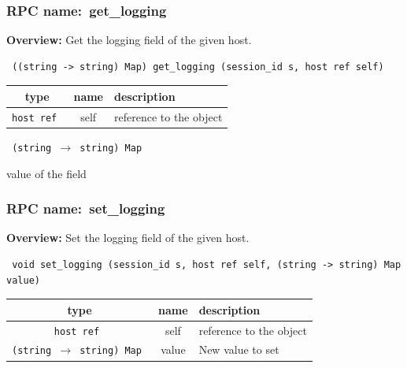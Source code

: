 \subsubsection{RPC name:~get\_logging}

{\bf Overview:} 
Get the logging field of the given host.

\begin{verbatim} ((string -> string) Map) get_logging (session_id s, host ref self)\end{verbatim}



 
\vspace{0.3cm}
\begin{tabular}{|c|c|p{7cm}|}
 \hline
{\bf type} & {\bf name} & {\bf description} \\ \hline
{\tt host ref } & self & reference to the object \\ \hline 

\end{tabular}

\vspace{0.3cm}

{\tt 
(string $\rightarrow$ string) Map
}


value of the field
\vspace{0.3cm}
\vspace{0.3cm}
\vspace{0.3cm}
\subsubsection{RPC name:~set\_logging}

{\bf Overview:} 
Set the logging field of the given host.

\begin{verbatim} void set_logging (session_id s, host ref self, (string -> string) Map value)\end{verbatim}



 
\vspace{0.3cm}
\begin{tabular}{|c|c|p{7cm}|}
 \hline
{\bf type} & {\bf name} & {\bf description} \\ \hline
{\tt host ref } & self & reference to the object \\ \hline 

{\tt (string $\rightarrow$ string) Map } & value & New value to set \\ \hline 

\end{tabular}

